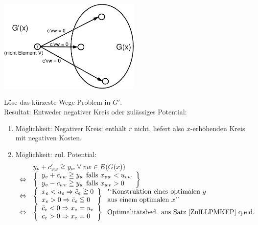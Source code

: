 \includegraphics[width=7cm]{bilder/4-1BeweisSatz42}


Löse das kürzeste Wege Problem in $G'$.\\
Resultat: Entweder negativer Kreis oder zulässiges Potential:
\begin{enumerate}
\item Möglichkeit: Negativer Kreis: enthält $r$ nicht, liefert also
$x$-erhöhenden Kreis mit negativen Kosten.
\item Möglichkeit: zul. Potential:
\[\begin{array}{ll}
&y_{v} + c'_{v w} \geqq y_{w} \; \forall \; v w \in E(G(x))\\
\Leftrightarrow&\left\{\begin{array}{l}
y_{v} + c_{v w} \geqq y_{w} \mbox{ falls }x_{v w} < u_{v w}\\
y_{v} - c_{w v} \geqq y_{w} \mbox{ falls }x_{w v} > 0 \end{array} \right\}\\
\Leftrightarrow&\left\{\begin{array}{l}
x_{e} < u_{e} \Rightarrow \bar{c}_{e} \geqq 0\\
x_{e} > 0 \Rightarrow \bar{c}_{e} \leqq 0\end{array} \right\}
\mbox{\begin{tabular}{l}"`Konstruktion eines optimalen $y$\\ 
aus einem optimalen $x$"'\end{tabular}}\\
\Leftrightarrow & \left\{\begin{array}{l} \bar{c}_{e} < 0 \Rightarrow x_{e}
= u_{e}\\
\bar{c}_{e} > 0 \Rightarrow x_{e} = 0 \end{array} \right\} \hspace{2mm}
\mbox{Optimalitätsbed. aus Satz \ref{ZulLLPMKFP} q.e.d. }
\end{array}\]
\end{enumerate}

